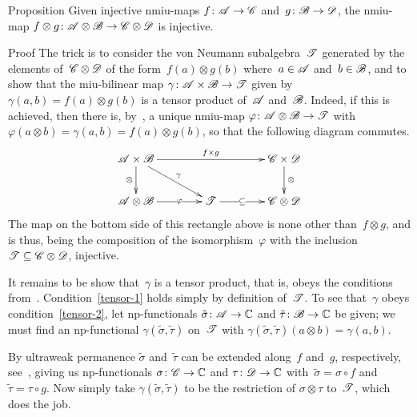\documentclass[a]{subfiles}
\begin{document}
\begin{parsec}
\begin{point}{Proposition}%
Given injective nmiu-maps
$f\colon \mathscr{A}\to\mathscr{C}$ and~$g\colon \mathscr{B}\to\mathscr{D}$,
the nmiu-map $f\otimes g\colon \mathscr{A}\otimes \mathscr{B}\to
\mathscr{C}\otimes\mathscr{D}$ is injective.
\begin{point}{Proof}%
The trick
is to consider the von Neumann subalgebra~$\mathscr{T}$
generated by
the elements of~$\mathscr{C}\otimes \mathscr{D}$
of the form~$f(a)\otimes g(b)$
where~$a\in\mathscr{A}$ and~$b\in\mathscr{B}$,
and to show that  the miu-bilinear map
$\gamma\colon \mathscr{A}\times\mathscr{B}\to\mathscr{T}$
given by~$\gamma(a,b)=f(a)\otimes g(b)$
is a tensor product of~$\mathscr{A}$ and~$\mathscr{B}$.
Indeed,
if this is achieved,
then
there is, by~,
a unique nmiu-map $\varphi\colon \mathscr{A}\otimes\mathscr{B}\to\mathscr{T}$
with $\varphi(a\otimes b)=\gamma(a,b)
=f(a)\otimes g(b)$,
so that the following diagram commutes.
\begin{equation*}
\xymatrix@C=4em{
\scrA\times \scrB
\ar[rr]^-{f\times g}
\ar[rd]^-\gamma
\ar[d]_-\otimes
&
&
\scrC\times\scrD 
\ar[d]^-\otimes
\\
\scrA\otimes\scrB
\ar[r]|-\varphi
&
\scrT
\ar[r]|-\subseteq
&
\scrC\otimes\scrD
}
\end{equation*}
The map on the bottom side of this rectangle above is
none other than~$f\otimes g$,
and is thus,
being
the composition of the isomorphism~$\varphi$
with the inclusion $\mathscr{T}\subseteq \mathscr{C}\otimes\mathscr{D}$,
injective.

It remains to be show that~$\gamma$
is a tensor product,
that is, obeys the conditions from~.
Condition~\ref{tensor-1}
holds simply by definition of~$\mathscr{T}$.
To see that~$\gamma$
obeys condition~\ref{tensor-2},
let np-functionals
$\tilde\sigma\colon \mathscr{A}\to\mathbb{C}$
and $\tilde\tau\colon \mathscr{B}\to\mathbb{C}$ be given;
we must find an np-functional $\gamma(\tilde\sigma,
\tilde\tau)$ on~$\mathscr{T}$
with $\gamma(\tilde\sigma,\tilde\tau)(a\otimes b)
= \gamma(a,b)$.

By ultraweak permanence
$\tilde\sigma$ and~$\tilde\tau$
can be extended along~$f$ and~$g$, respectively,
see~,
giving us np-functionals $\sigma\colon \mathscr{C}\to\mathbb{C}$
and $\tau\colon\mathscr{D}\to\mathbb{C}$
with~$\tilde\sigma = \sigma\circ f$
and $\tilde\tau = \tau\circ g$.
Now simply take $\gamma(\tilde\sigma,\tilde\tau)$
to be the restriction
of $\sigma\otimes \tau$
to~$\mathscr{T}$,
which does the job.


\end{point}
\end{point}
\end{parsec}
\end{document}
